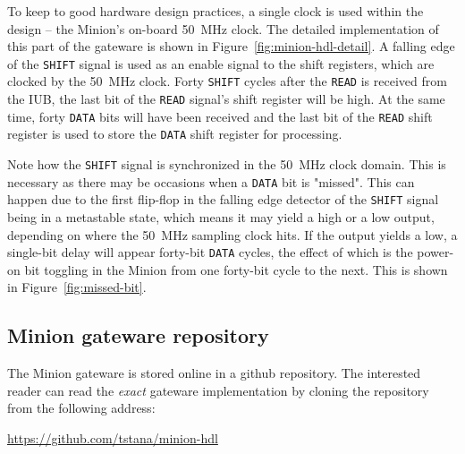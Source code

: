 \documentclass[a4paper,11pt]{article}
\begin{document}
To keep to good hardware design practices, a single clock is used within the design --
the Minion's on-board 50~MHz clock. The detailed implementation of this part of the
gateware is shown in Figure~\ref{fig:minion-hdl-detail}. A falling edge of the 
\verb=SHIFT= signal is used as an enable signal to the shift registers, which are clocked 
by the 50~MHz clock. Forty \verb=SHIFT= cycles after the \verb=READ= is received from the 
IUB, the last bit of the \verb=READ= signal's shift register will be high. At the same 
time, forty \verb=DATA= bits will have been received and the last bit of the \verb=READ= 
shift register is used to store the \verb=DATA= shift register for processing. 

Note how the \verb=SHIFT= signal is synchronized in the 50~MHz clock domain. This is
necessary as there may be occasions when a \verb=DATA= bit is "missed". This
can happen due to the first flip-flop in the falling edge detector of the \verb=SHIFT= 
signal being in a metastable state, which means it may
yield a high or a low output, depending on where the 50~MHz sampling clock hits. If
the output yields a low, a single-bit delay will appear forty-bit \verb=DATA= cycles, the 
effect of which is the power-on bit toggling in the Minion from one forty-bit cycle to
the next. This is shown in Figure~\ref{fig:missed-bit}.

\subsection{Minion gateware repository}

The Minion gateware is stored online in a github repository. The interested reader can 
read the \textit{exact} gateware implementation by cloning the repository from the 
following address:

\begin{center}
  \url{https://github.com/tstana/minion-hdl}
\end{center}

\pagebreak
%
%
\end{document}

